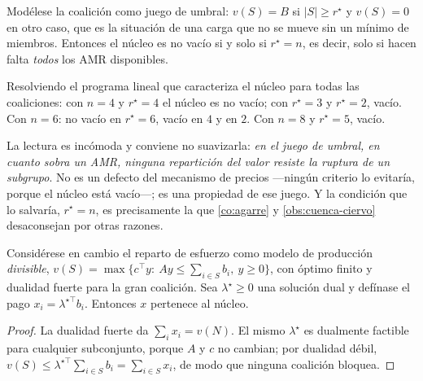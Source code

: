 \begin{proposicion}
\label{pr:nucleo}
Modélese la coalición como juego de umbral: $v(S)=B$ si $\lvert S\rvert\ge
r^\star$ y $v(S)=0$ en otro caso, que es la situación de una carga que no se
mueve sin un mínimo de miembros. Entonces el núcleo es no vacío si y solo si
$r^\star=n$, es decir, solo si hacen falta \emph{todos} los AMR disponibles.
\end{proposicion}

\begin{observacion}
\label{obs:nucleo-vacio}
Resolviendo el programa lineal que caracteriza el núcleo para todas las
coaliciones: con $n=4$ y $r^\star=4$ el núcleo es no vacío; con $r^\star=3$ y
$r^\star=2$, vacío. Con $n=6$: no vacío en $r^\star=6$, vacío en $4$ y en $2$.
Con $n=8$ y $r^\star=5$, vacío.

La lectura es incómoda y conviene no suavizarla: \emph{en el juego de umbral, en
cuanto sobra un AMR, ninguna repartición del valor resiste la ruptura de un
subgrupo}. No es un defecto del mecanismo de precios —ningún criterio lo
evitaría, porque el núcleo está vacío—; es una propiedad de ese juego. Y la
condición que lo salvaría, $r^\star=n$, es precisamente la que \cref{co:agarre} y
\cref{obs:cuenca-ciervo} desaconsejan por otras razones.
\end{observacion}

\begin{proposicion}
\label{pr:nucleo-divisible}
Considérese en cambio el reparto de esfuerzo como modelo de producción
\emph{divisible}, $v(S)=\max\{c^{\!\top}y:\ Ay\le\sum_{i\in S}b_i,\ y\ge0\}$, con
óptimo finito y dualidad fuerte para la gran coalición. Sea $\lambda^\star\ge0$
una solución dual y defínase el pago $x_i=\lambda^{\star\top}b_i$. Entonces $x$
pertenece al núcleo.
\end{proposicion}

\begin{proof}
La dualidad fuerte da $\sum_i x_i=v(N)$. El mismo $\lambda^\star$ es dualmente
factible para cualquier subconjunto, porque $A$ y $c$ no cambian; por dualidad
débil, $v(S)\le\lambda^{\star\top}\sum_{i\in S}b_i=\sum_{i\in S}x_i$, de modo que
ninguna coalición bloquea.
\end{proof}


